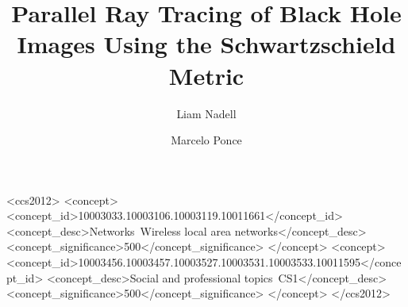 \documentclass[acmsmall]{acmart}
\begin{document}
\title[BH RayTracer]{Parallel Ray Tracing of Black Hole Images Using the Schwartzschield Metric}

\author{Liam Nadell}
\author{Marcelo Ponce}



\begin{abstract}

\end{abstract}

\begin{CCSXML}
<ccs2012>
   <concept>
       <concept_id>10003033.10003106.10003119.10011661</concept_id>
       <concept_desc>Networks~Wireless local area networks</concept_desc>
       <concept_significance>500</concept_significance>
       </concept>
   <concept>
       <concept_id>10003456.10003457.10003527.10003531.10003533.10011595</concept_id>
       <concept_desc>Social and professional topics~CS1</concept_desc>
       <concept_significance>500</concept_significance>
       </concept>
 </ccs2012>
\end{CCSXML}



\end{document}
